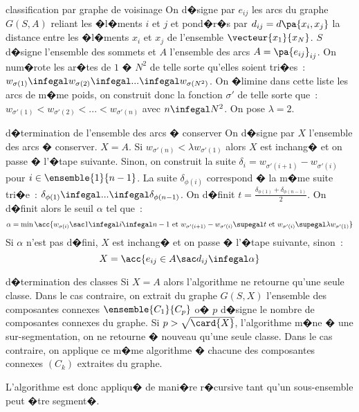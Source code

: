         \begin{xalgorithm}{classification par graphe de voisinage}
        \label{classification_graphe_band}
        On d�signe par $e_{ij}$ les arcs du graphe $G(S,A)$ 
        reliant les �l�ments $i$ et $j$ et pond�r�s par $d_{ij} = d\pa{x_i,x_j}$ la distance
        entre les �l�ments $x_i$ et $x_j$ de l'ensemble $\vecteur{x_1}{x_N}$. $S$ d�signe l'ensemble
        des sommets et $A$ l'ensemble des arcs $A = \pa{e_{ij}}_{ij}$. 
        On num�rote les ar�tes de $1$
        � $N^2$ de telle sorte qu'elles soient tri�es~: $w_{\sigma(1)} \infegal w_{\sigma(2)} \infegal ... \infegal
        w_{\sigma(N^2)}$. On �limine dans cette liste les arcs de m�me poids, on construit donc la fonction $\sigma'$
        de telle sorte que~: $w_{\sigma'(1)} < w_{\sigma'(2)} < ... < w_{\sigma'(n)}$ avec $n \infegal N^2$. On pose
        $\lambda = 2$.
        
        \begin{xalgostep}{d�termination de l'ensemble des arcs � conserver}
        On d�signe par $X$ l'ensemble des arcs � conserver. $X = A$. Si $w_{\sigma'(n)} < \lambda w_{\sigma'(1)}$ alors $X$
        est inchang� et on passe � l'�tape suivante. Sinon, on construit la suite 
        $\delta_i = w_{\sigma'(i+1)} - w_{\sigma'(i)}$ pour $i \in \ensemble{1}{n-1}$. La suite $\delta_{\phi(i)}$
        correspond � la m�me suite tri�e~: $\delta_{\phi(1)} \infegal  ... \infegal \delta_{\phi(n-1)}$. On d�finit 
        $t = \frac{\delta_{\phi(1)} + \delta_{\phi(n-1)}} {2}$. On d�finit alors le seuil $\alpha$ tel que~:
                    $$
                    \alpha = \min \acc{ w_{\sigma(i)} \sac
                                                            1 \infegal i \infegal n-1 \text{ et } 
                                                            w_{\sigma'(i+1)} - w_{\sigma'(i)} \supegal t \text{ et }
                                                            w_{\sigma'(i)} \supegal \lambda w_{\sigma'(1)}}
                    $$
        Si $\alpha$ n'est pas d�fini, $X$ est inchang� et on passe � l'�tape suivante, sinon~:
                    $$
                    X = \acc{ e_{ij} \in A \sac d_{ij} \infegal \alpha}
                    $$
        \end{xalgostep}
        
        \begin{xalgostep}{d�termination des classes}
        Si $X = A$ alors l'algorithme ne retourne qu'une seule classe. Dans le cas contraire,
        on extrait du graphe $G(S,X)$ l'ensemble des composantes connexes $\ensemble{C_1}{C_p}$ o�
        $p$ d�signe le nombre de composantes connexes du graphe.
        Si $p > \sqrt{ \card{X}}$, l'algorithme m�ne � une sur-segmentation, on ne retourne � nouveau qu'une seule
        classe. Dans le cas contraire, on applique ce m�me algorithme � chacune des composantes connexes $(C_k)$
        extraites du graphe. 
        \end{xalgostep}
        
        L'algorithme est donc appliqu� de mani�re r�cursive tant qu'un sous-ensemble
        peut �tre segment�.
        \end{xalgorithm}



